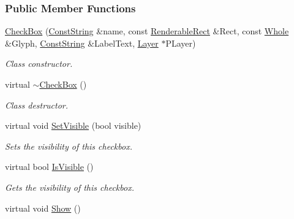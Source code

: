 \subsubsection*{Public Member Functions}
\begin{DoxyCompactItemize}
\item 
\hyperlink{classphys_1_1UI_1_1CheckBox_abeaca46fbfa961670c20ad949627d0fa}{CheckBox} (\hyperlink{namespacephys_a5ce5049f8b4bf88d6413c47b504ebb31}{ConstString} \&name, const \hyperlink{structphys_1_1UI_1_1RenderableRect}{RenderableRect} \&Rect, const \hyperlink{namespacephys_a460f6bc24c8dd347b05e0366ae34f34a}{Whole} \&Glyph, \hyperlink{namespacephys_a5ce5049f8b4bf88d6413c47b504ebb31}{ConstString} \&LabelText, \hyperlink{classphys_1_1UI_1_1Layer}{Layer} $\ast$PLayer)
\begin{DoxyCompactList}\small\item\em Class constructor. \item\end{DoxyCompactList}\item 
\hypertarget{classphys_1_1UI_1_1CheckBox_a60c4d62c357a7158d69888a367b5dc56}{
virtual \hyperlink{classphys_1_1UI_1_1CheckBox_a60c4d62c357a7158d69888a367b5dc56}{$\sim$CheckBox} ()}
\label{classphys_1_1UI_1_1CheckBox_a60c4d62c357a7158d69888a367b5dc56}

\begin{DoxyCompactList}\small\item\em Class destructor. \item\end{DoxyCompactList}\item 
virtual void \hyperlink{classphys_1_1UI_1_1CheckBox_aac2babdb951a7b716b5cfff9b925420f}{SetVisible} (bool visible)
\begin{DoxyCompactList}\small\item\em Sets the visibility of this checkbox. \item\end{DoxyCompactList}\item 
virtual bool \hyperlink{classphys_1_1UI_1_1CheckBox_a8a2be0cba227f0921071fb14de24f76d}{IsVisible} ()
\begin{DoxyCompactList}\small\item\em Gets the visibility of this checkbox. \item\end{DoxyCompactList}\item 
\hypertarget{classphys_1_1UI_1_1CheckBox_afceb8a1afac295be23227462e6cbc369}{
virtual void \hyperlink{classphys_1_1UI_1_1CheckBox_afceb8a1afac295be23227462e6cbc369}{Show} ()}
\label{classphys_1_1UI_1_1CheckBox_afceb8a1afac295be23227462e6cbc369}


\end{DoxyCompactItemize}
